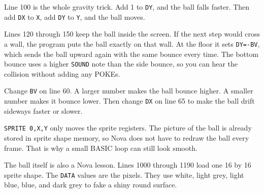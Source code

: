 Line 100 is the whole gravity trick. Add 1 to \texttt{DY}, and the ball falls
faster. Then add \texttt{DX} to \texttt{X}, add \texttt{DY} to \texttt{Y}, and
the ball moves.

Lines 120 through 150 keep the ball inside the screen. If the next step would
cross a wall, the program puts the ball exactly on that wall. At the floor it
sets \texttt{DY=-BV}, which sends the ball upward again with the same bounce
every time. The bottom bounce uses a higher \texttt{SOUND} note than the side
bounce, so you can hear the collision without adding any POKEs.

\begin{trythisbox}
Change \texttt{BV} on line 60. A larger number makes the ball bounce higher.
A smaller number makes it bounce lower. Then change \texttt{DX} on line 65 to
make the ball drift sideways faster or slower.
\end{trythisbox}

\begin{novabox}
\texttt{SPRITE 0,X,Y} only moves the sprite registers. The picture of the ball
is already stored in sprite shape memory, so Nova does not have to redraw the
ball every frame. That is why a small BASIC loop can still look smooth.
\end{novabox}

The ball itself is also a Nova lesson. Lines 1000 through 1190 load one 16 by
16 sprite shape. The \texttt{DATA} values are the pixels. They use white, light
grey, light blue, blue, and dark grey to fake a shiny round surface.
